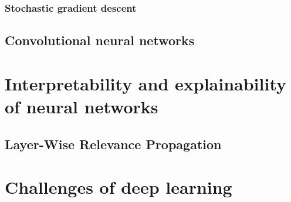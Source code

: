 \subsubsection*{Stochastic gradient descent}




\subsection{Convolutional neural networks}


\section{Interpretability and explainability of neural networks}

\subsection{Layer-Wise Relevance Propagation}



\section{Challenges of deep learning}


